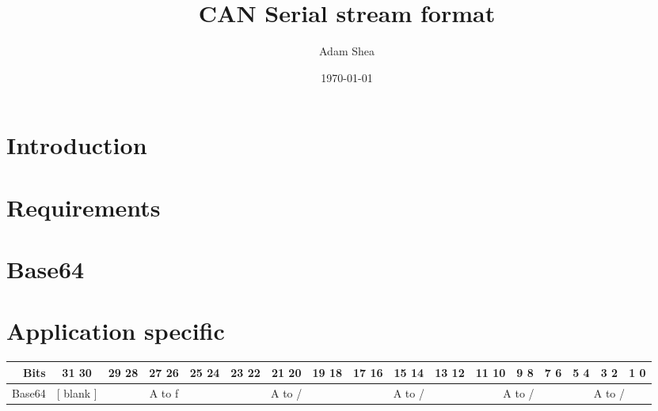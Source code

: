 \documentclass[12pt,letterpaper]{proc}
\title{CAN Serial stream format}
\author{Adam Shea}
\date{\today}
\begin{document}
\maketitle

\section{Introduction}

\section{Requirements}

\section{Base64}

\section{Application specific}

\begin{tiny}
\begin{tabular}[h]{r|c|c|c|c|c|c|c|c|c|c|c|c|c|c|c|c|}
\hline
Bits&31 30&29 28&27 26&25 24&23 22&21 20&19 18&17 16&
15 14&13 12&11 10&9 8&7 6&5 4&3 2&1 0 \\ \hline
Base64&[ blank ]&\multicolumn{3}{c|}{A to f}&\multicolumn{3}{c|}{A to /}&
\multicolumn{3}{c|}{A to /}&\multicolumn{3}{c|}{A to /}&
\multicolumn{3}{c|}{A to /} \\ \hline
\end{tabular}
\end{tiny}
\end{document}
